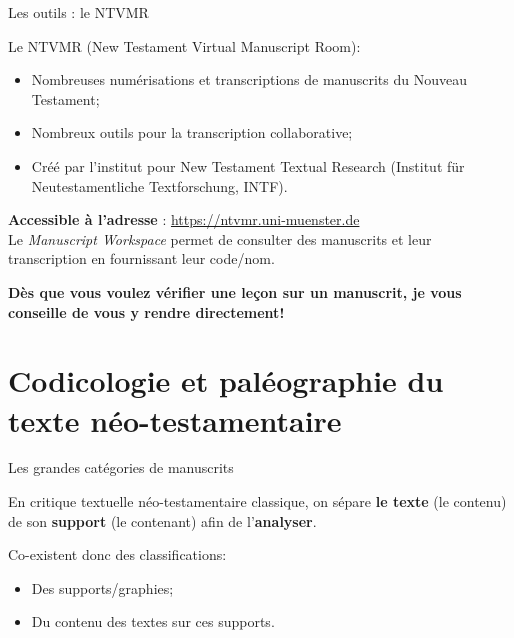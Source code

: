 \documentclass[11pt]{beamer}
\begin{document}
\begin{frame}{Les outils : le NTVMR}


Le NTVMR (New Testament Virtual Manuscript Room):
    \begin{itemize}
        \item Nombreuses numérisations et transcriptions de manuscrits du Nouveau Testament;
        \item Nombreux outils pour la transcription collaborative;
        \item Créé par l'institut pour New Testament Textual Research (Institut für Neutestamentliche Textforschung, INTF).
    \end{itemize}


    \textbf{Accessible à l'adresse} : \url{https://ntvmr.uni-muenster.de}\\

    Le \textit{Manuscript Workspace} permet de consulter des manuscrits et leur transcription en fournissant leur code/nom. 
    \begin{alertblock}{}
        \textbf{Dès que vous voulez vérifier une leçon sur un manuscrit, je vous conseille de vous y rendre directement!} 
    \end{alertblock}

\end{frame}




\section{Codicologie et paléographie du texte néo-testamentaire}

\begin{frame}{Les grandes catégories de manuscrits}
        \begin{alertblock}{}
En critique textuelle néo-testamentaire classique, on sépare \textbf{le texte} (le contenu) de son \textbf{support} (le contenant) afin de l'\textbf{analyser}. 
    \end{alertblock}

    Co-existent donc des classifications:
    \begin{itemize}
        \item Des supports/graphies;
        \item Du contenu des textes sur ces supports.
    \end{itemize}
\end{frame}
\end{document}
